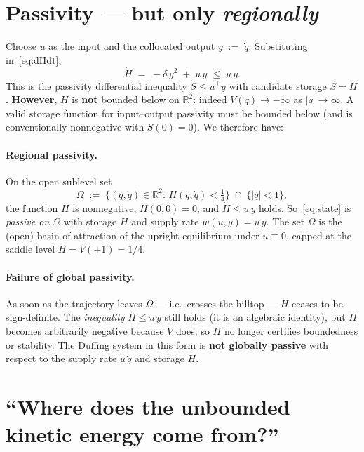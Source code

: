 \documentclass[11pt]{article}
\newcommand{\R}{\mathbb{R}}
\begin{document}
\section{Passivity --- but only \emph{regionally}}

Choose $u$ as the input and the collocated output
\(
y \;:=\; \dot q.
\)
Substituting in~\eqref{eq:dHdt},
\begin{equation}
\dot H
  \;=\; -\delta\,y^2 \;+\; u\,y
  \;\le\; u\,y.
\label{eq:passivity-ineq}
\end{equation}
This is the passivity differential inequality
$\dot S \le u^\top y$ with candidate storage $S = H$.
\textbf{However}, $H$ is {\bfseries not} bounded below on $\R^2$:
indeed $V(q) \to -\infty$ as $|q|\to\infty$. A valid storage function
for input--output passivity must be bounded below (and is conventionally
nonnegative with $S(0)=0$). We therefore have:

\paragraph{Regional passivity.}
On the open sublevel set
\begin{equation}
\Omega
  \;:=\;
  \bigl\{ (q,\dot q)\in\R^2 :\, H(q,\dot q) < \tfrac{1}{4} \bigr\}
  \;\cap\;
  \bigl\{|q| < 1\bigr\},
\label{eq:Omega}
\end{equation}
the function $H$ is nonnegative, $H(0,0)=0$, and
$\dot H \le u\,y$ holds. So~\eqref{eq:state} is
\emph{passive on $\Omega$} with storage $H$ and supply rate
$w(u,y)=u\,y$. The set $\Omega$ is the (open) basin of attraction of
the upright equilibrium under $u\equiv 0$, capped at the saddle level
$H = V(\pm 1) = 1/4$.

\paragraph{Failure of global passivity.}
As soon as the trajectory leaves $\Omega$ --- i.e.\ crosses the
hilltop ---
$H$ ceases to be sign-definite. The {\itshape inequality}
$\dot H \le u\,y$ still holds (it is an algebraic identity), but $H$
becomes arbitrarily negative because $V$ does, so $H$ no longer
certifies boundedness or stability. The Duffing system in this form is
{\bfseries not globally passive} with respect to the supply rate
$u\,\dot q$ and storage $H$.

\section{``Where does the unbounded kinetic energy come from?''}
\end{document}
